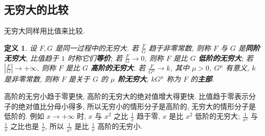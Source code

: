 \documentclass[UTF8,openany]{ctexbook}
\theoremstyle{chinesetextbook}
\newtheorem{definition}{定义}[section]
\begin{document}
\subsection{无穷大的比较}
无穷大同样用比值来比较.
\begin{definition}
设 $F,G$ 是同一过程中的无穷大. 若 $\displaystyle\frac FG$ 趋于非零常数, 则称 $F$ 与 $G$ 是\textbf{同阶无穷大}, 比值趋于 $1$ 时称它们\textbf{等价}; 若 $\displaystyle\frac FG\to0$, 则称 $F$ 是比 $G$ \textbf{低阶的无穷大}; 若 $\displaystyle\left|\frac FG\right|\to+\infty$, 则称 $F$ 是比 $G$ \textbf{高阶的无穷大}. 若 $\displaystyle\frac F{G^\mu}\to k$, 其中 $\mu>0$, $G^\mu$ 有意义, $k$ 是非零常数, 则称 $F$ 是关于 $G$ 的 \textbf{$\mu$ 阶无穷大}, $kG^\mu$ 称为 $F$ 的\textbf{主部}.
\end{definition}
高阶的无穷小趋于零更快, 高阶的无穷大的绝对值增大得更快. 比值趋于零表示分子的绝对值比分母小得多, 所以无穷小的情形分子是高阶的, 无穷大的情形分子是低阶的. 例如 $x\to+\infty$ 时, $x$ 与 $x^2$ 之比 $\displaystyle\frac1x$ 趋于零, $x$ 是比 $x^2$ 低阶的无穷大; $\displaystyle\frac1{x^2}$ 与 $\displaystyle\frac1x$ 之比也是 $\displaystyle\frac1x$, 所以 $\displaystyle\frac1{x^2}$ 是比 $\displaystyle\frac1x$ 高阶的无穷小.
\end{document}
